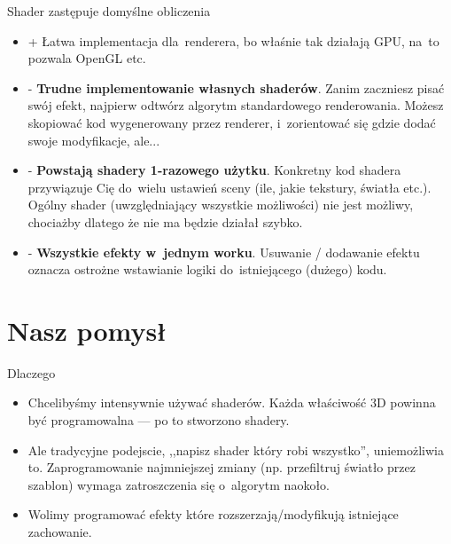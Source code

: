 \documentclass{beamer}
\begin{document}
\begin{frame}{Shader zastępuje domyślne obliczenia}

\begin{itemize}
  \item + Łatwa implementacja dla~renderera, bo właśnie tak działają GPU,
    na~to pozwala OpenGL etc.
  \item - \textbf{Trudne implementowanie własnych shaderów}.
    Zanim zaczniesz pisać swój efekt, najpierw odtwórz algorytm
    standardowego renderowania.
    Możesz skopiować kod wygenerowany przez renderer,
    i~zorientować się gdzie dodać swoje modyfikacje, ale...
  \item - \textbf{Powstają shadery 1-razowego użytku}.
    Konkretny kod shadera przywiązuje Cię do~wielu ustawień sceny
    (ile, jakie tekstury, światła etc.).
    Ogólny shader (uwzględniający wszystkie możliwości) nie jest możliwy,
    chociażby dlatego że nie ma będzie działał szybko.
  \item - \textbf{Wszystkie efekty w~jednym worku}.
    Usuwanie / dodawanie efektu oznacza ostrożne wstawianie logiki
    do~istniejącego (dużego) kodu.
\end{itemize}
\end{frame}

\section{Nasz pomysł}

\begin{frame}{Dlaczego}
\begin{itemize}
  \item Chcelibyśmy intensywnie używać shaderów. Każda właściwość 3D powinna
    być programowalna --- po to stworzono shadery.

  \item Ale tradycyjne podejscie, ,,napisz shader który robi wszystko'',
    uniemożliwia to. Zaprogramowanie najmniejszej zmiany (np. przefiltruj
    światło przez szablon) wymaga zatroszczenia się o~algorytm naokoło.

  \item Wolimy programować efekty które rozszerzają/modyfikują
    istniejące zachowanie.
\end{itemize}
\end{frame}
\end{document}
